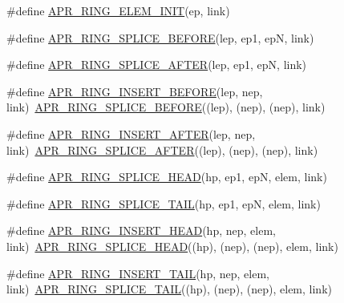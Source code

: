 \begin{DoxyCompactItemize}
\item 
\#define \hyperlink{group__apr__ring_gae5048ecda4b26b012ee93c2c830058cb}{A\-P\-R\-\_\-\-R\-I\-N\-G\-\_\-\-E\-L\-E\-M\-\_\-\-I\-N\-I\-T}(ep, link)
\item 
\#define \hyperlink{group__apr__ring_ga438e7369e650ee07ac98ed0731589750}{A\-P\-R\-\_\-\-R\-I\-N\-G\-\_\-\-S\-P\-L\-I\-C\-E\-\_\-\-B\-E\-F\-O\-R\-E}(lep, ep1, ep\-N, link)
\item 
\#define \hyperlink{group__apr__ring_ga53e6564eba59d7e734a0ce03cb418a42}{A\-P\-R\-\_\-\-R\-I\-N\-G\-\_\-\-S\-P\-L\-I\-C\-E\-\_\-\-A\-F\-T\-E\-R}(lep, ep1, ep\-N, link)
\item 
\#define \hyperlink{group__apr__ring_ga76f9a04f932b3377073fa4e30d745564}{A\-P\-R\-\_\-\-R\-I\-N\-G\-\_\-\-I\-N\-S\-E\-R\-T\-\_\-\-B\-E\-F\-O\-R\-E}(lep, nep, link)~\hyperlink{group__apr__ring_ga438e7369e650ee07ac98ed0731589750}{A\-P\-R\-\_\-\-R\-I\-N\-G\-\_\-\-S\-P\-L\-I\-C\-E\-\_\-\-B\-E\-F\-O\-R\-E}((lep), (nep), (nep), link)
\item 
\#define \hyperlink{group__apr__ring_ga40453637d00c853f3a212a30c1f2cb41}{A\-P\-R\-\_\-\-R\-I\-N\-G\-\_\-\-I\-N\-S\-E\-R\-T\-\_\-\-A\-F\-T\-E\-R}(lep, nep, link)~\hyperlink{group__apr__ring_ga53e6564eba59d7e734a0ce03cb418a42}{A\-P\-R\-\_\-\-R\-I\-N\-G\-\_\-\-S\-P\-L\-I\-C\-E\-\_\-\-A\-F\-T\-E\-R}((lep), (nep), (nep), link)
\item 
\#define \hyperlink{group__apr__ring_ga592e71a7cf219fc70f4fc47c60ef4c64}{A\-P\-R\-\_\-\-R\-I\-N\-G\-\_\-\-S\-P\-L\-I\-C\-E\-\_\-\-H\-E\-A\-D}(hp, ep1, ep\-N, elem, link)
\item 
\#define \hyperlink{group__apr__ring_ga51e02e214fb6e218f45ff23cbd1f7abc}{A\-P\-R\-\_\-\-R\-I\-N\-G\-\_\-\-S\-P\-L\-I\-C\-E\-\_\-\-T\-A\-I\-L}(hp, ep1, ep\-N, elem, link)
\item 
\#define \hyperlink{group__apr__ring_gad59352546dc9253c0057ad43cf728a63}{A\-P\-R\-\_\-\-R\-I\-N\-G\-\_\-\-I\-N\-S\-E\-R\-T\-\_\-\-H\-E\-A\-D}(hp, nep, elem, link)~\hyperlink{group__apr__ring_ga592e71a7cf219fc70f4fc47c60ef4c64}{A\-P\-R\-\_\-\-R\-I\-N\-G\-\_\-\-S\-P\-L\-I\-C\-E\-\_\-\-H\-E\-A\-D}((hp), (nep), (nep), elem, link)
\item 
\#define \hyperlink{group__apr__ring_ga235311035184125d72ce0689c9949a3e}{A\-P\-R\-\_\-\-R\-I\-N\-G\-\_\-\-I\-N\-S\-E\-R\-T\-\_\-\-T\-A\-I\-L}(hp, nep, elem, link)~\hyperlink{group__apr__ring_ga51e02e214fb6e218f45ff23cbd1f7abc}{A\-P\-R\-\_\-\-R\-I\-N\-G\-\_\-\-S\-P\-L\-I\-C\-E\-\_\-\-T\-A\-I\-L}((hp), (nep), (nep), elem, link)
\item 

\end{DoxyCompactItemize}
